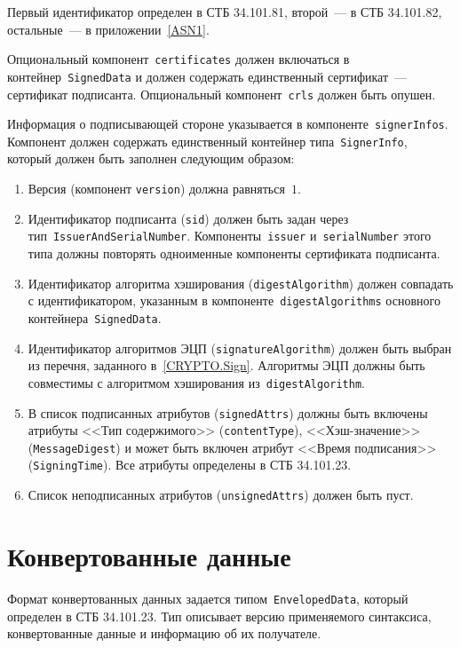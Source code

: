 Первый идентификатор определен в СТБ 34.101.81, второй~--- в СТБ 
34.101.82, остальные~--- в приложении~\ref{ASN1}.

Опциональный компонент~\texttt{certificates}
должен включаться в контейнер~\texttt{SignedData} и должен 
содержать единственный сертификат~--- сертификат подписанта.
%
Опциональный компонент~\texttt{crls} должен быть опушен.

Информация о подписывающей стороне указывается в 
компоненте~\texttt{signerInfos}. Компонент должен содержать единственный 
контейнер типа~\texttt{SignerInfo}, который должен быть заполнен следующим 
образом: 
\begin{enumerate}
\item 
Версия (компонент \texttt{version}) должна равняться~$1$.
\item 
Идентификатор подписанта (\texttt{sid}) должен быть задан через
тип~\texttt{IssuerAndSerialNumber}. Компоненты~\texttt{issuer} 
и~\texttt{serialNumber} этого типа должны повторять одноименные компоненты 
сертификата подписанта.
\item 
Идентификатор алгоритма хэширования (\texttt{digestAlgorithm}) должен 
совпадать с идентификатором, указанным в 
компоненте~\texttt{digestAlgorithms} основного 
контейнера~\texttt{SignedData}. 
\item 
Идентификатор алгоритмов ЭЦП (\texttt{signatureAlgorithm}) должен 
быть выбран из перечня, заданного в~\ref{CRYPTO.Sign}. 
Алгоритмы ЭЦП должны быть совместимы с алгоритмом хэширования 
из~\texttt{digestAlgorithm}.
\item 
В список подписанных атрибутов (\texttt{signedAttrs}) должны 
быть включены атрибуты <<Тип содержимого>> (\texttt{contentType}),
<<Хэш-значение>> (\texttt{MessageDigest}) и может быть включен
атрибут <<Время подписания>> (\texttt{SigningTime}). 
Все атрибуты определены в СТБ 34.101.23. 
\item 
Список неподписанных атрибутов (\texttt{unsignedAttrs}) должен быть пуст.
\end{enumerate}

\section{Конвертованные данные}\label{FMT.EnvelopedData}

Формат конвертованных данных задается типом~\texttt{EnvelopedData}, который
определен в СТБ 34.101.23. Тип описывает версию применяемого синтаксиса,
конвертованные данные и информацию об их получателе.

